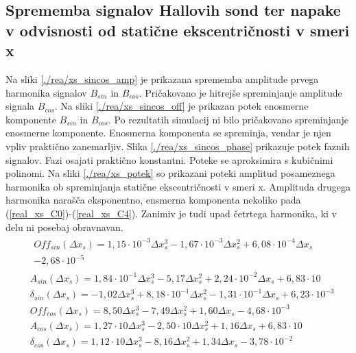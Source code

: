\subsection{Sprememba signalov Hallovih sond ter napake v odvisnosti od statične ekscentričnosti v smeri x}
Na sliki \ref{./rea/xs_sincos_amp} je prikazana sprememba amplitude prvega harmonika signalov $B_{sin}$ in $B_{cos}$. Pričakovano je hitrejše spreminjanje amplitude signala $B_{cos}$. Na sliki \ref{./rea/xs_sincos_off} je prikazan potek enosmerne komponente $B_{sin}$ in $B_{cos}$. Po rezultatih simulacij ni bilo pričakovano spreminjanje enosmerne komponente. Enosmerna komponenta se spreminja, vendar je njen vpliv praktično zanemarljiv. Slika \ref{./rea/xs_sincos_phase} prikazuje potek faznih signalov. Fazi osajati praktično konstantni.
\newpage
Poteke se aproksimira s kubičnimi polinomi.
Na sliki \ref{./rea/xs_potek} so prikazani poteki amplitud posameznega harmonika ob spreminjanja statične ekscentričnosti v smeri x. Amplituda drugega harmonika narašča eksponentno, ensmerna komponenta nekoliko pada (\ref{real_xs_C0})-(\ref{real_xs_C4}). Zanimiv je tudi upad četrtega harmonika, ki v delu ni posebaj obravnavan.
\begin{eqnarray}
&\begin{split}
Off_{sin}(\Delta x_s) =1,15\cdot 10^{-3}\Delta x_s^{3}-1,67\cdot 10^{-3}\Delta x_s^{2}+6,08\cdot 10^{-4}\Delta x_s\\-2,68\cdot 10^{-5}
\end{split}\\
&A_{sin}(\Delta x_s) =1,84\cdot 10^{-1}\Delta x_s^{3}-5,17\Delta x_s^{2}+2,24\cdot 10^{-2}\Delta x_s+6,83\cdot 10 \\                    
&\delta_{sin}(\Delta x_s) =-1,02\Delta x_s^{3}+8,18\cdot 10^{-1}\Delta x_s^{2}-1,31\cdot 10^{-1}\Delta x_s+6,23\cdot 10^{-3} \\             
&Off_{cos}(\Delta x_s) =8,50\Delta x_s^{3}-7,49\Delta x_s^{2}+1,60\Delta x_s-4,68\cdot 10^{-3} \\                                       
&A_{cos}(\Delta x_s) =1,27\cdot 10\Delta x_s^{3}-2,50\cdot 10\Delta x_s^{2}+1,16\Delta x_s+6,83\cdot 10 \\                              
&\delta_{cos}(\Delta x_s) =1,12\cdot 10\Delta x_s^{3}-8,16\Delta x_s^{2}+1,34\Delta x_s-3,78\cdot 10^{-2}
\end{eqnarray}
